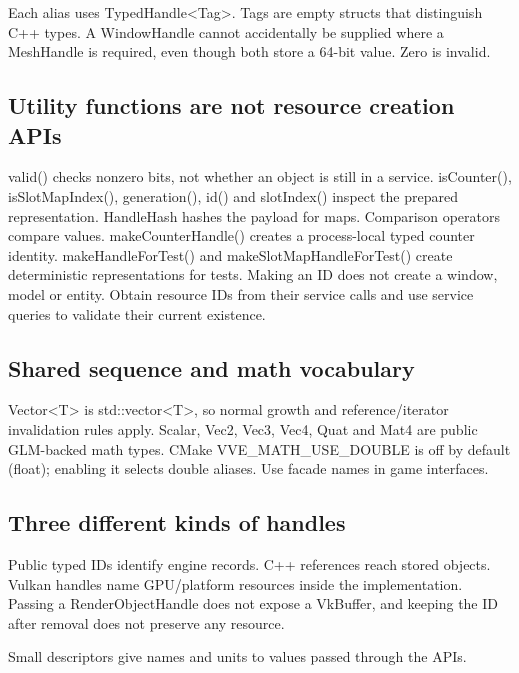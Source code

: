 \documentclass[11pt,a4paper]{article}
\begin{document}
Each alias uses TypedHandle<Tag>. Tags are empty structs that distinguish C++ types. A WindowHandle cannot accidentally be supplied where a MeshHandle is required, even though both store a 64-bit value. Zero is invalid.

\subsection*{Utility functions are not resource creation APIs}
valid() checks nonzero bits, not whether an object is still in a service. isCounter(), isSlotMapIndex(), generation(), id() and slotIndex() inspect the prepared representation. HandleHash hashes the payload for maps. Comparison operators compare values. makeCounterHandle() creates a process-local typed counter identity. makeHandleForTest() and makeSlotMapHandleForTest() create deterministic representations for tests. Making an ID does not create a window, model or entity. Obtain resource IDs from their service calls and use service queries to validate their current existence.

\subsection*{Shared sequence and math vocabulary}
Vector<T> is std::vector<T>, so normal growth and reference/iterator invalidation rules apply. Scalar, Vec2, Vec3, Vec4, Quat and Mat4 are public GLM-backed math types. CMake VVE\_MATH\_USE\_DOUBLE is off by default (float); enabling it selects double aliases. Use facade names in game interfaces.

\subsection*{Three different kinds of handles}
Public typed IDs identify engine records. C++ references reach stored objects. Vulkan handles name GPU/platform resources inside the implementation. Passing a RenderObjectHandle does not expose a VkBuffer, and keeping the ID after removal does not preserve any resource.

\label{core-21}
Small descriptors give names and units to values passed through the APIs.
\end{document}
